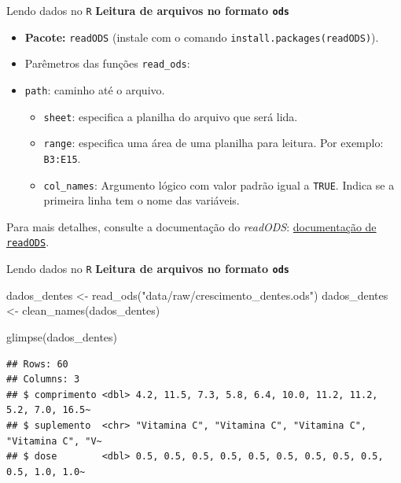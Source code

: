 \documentclass[
  10pt,
  ignorenonframetext,
]{beamer}
\newenvironment{Shaded}{}{}
\newcommand{\KeywordTok}[1]{\textcolor[rgb]{0.00,0.00,1.00}{#1}}
\newcommand{\NormalTok}[1]{#1}
\newcommand{\StringTok}[1]{\textcolor[rgb]{0.00,0.50,0.50}{#1}}
\providecommand{\tightlist}{%
  \setlength{\itemsep}{0pt}\setlength{\parskip}{0pt}}
\begin{document}
\begin{frame}[fragile]{Lendo dados no \texttt{R}}
\protect\hypertarget{lendo-dados-no-r-4}{}
\textbf{Leitura de arquivos no formato \texttt{ods}}

\begin{itemize}
\tightlist
\item
  \textbf{Pacote:} \texttt{readODS} (instale com o comando
  \texttt{install.packages(\textquotesingle{}readODS\textquotesingle{})}).
\item
  Parêmetros das funções \texttt{read\_ods}:
\item
  \texttt{path}: caminho até o arquivo.

  \begin{itemize}
  \tightlist
  \item
    \texttt{sheet}: especifica a planilha do arquivo que será lida.
  \item
    \texttt{range}: especifica uma área de uma planilha para leitura.
    Por exemplo: \texttt{B3:E15}.
  \item
    \texttt{col\_names}: Argumento lógico com valor padrão igual a
    \texttt{TRUE}. Indica se a primeira linha tem o nome das variáveis.
  \end{itemize}
\end{itemize}

Para mais detalhes, consulte a documentação do \emph{readODS}:
\href{https://github.com/chainsawriot/readODS}{documentação de
\texttt{readODS}}.
\end{frame}

\begin{frame}[fragile]{Lendo dados no \texttt{R}}
\protect\hypertarget{lendo-dados-no-r-5}{}
\textbf{Leitura de arquivos no formato \texttt{ods}}

\begin{Shaded}
\begin{Highlighting}[]
\NormalTok{dados\_dentes \textless{}{-}}\StringTok{ }\KeywordTok{read\_ods}\NormalTok{(}\StringTok{"data/raw/crescimento\_dentes.ods"}\NormalTok{)}
\NormalTok{dados\_dentes \textless{}{-}}\StringTok{ }\KeywordTok{clean\_names}\NormalTok{(dados\_dentes)}

\KeywordTok{glimpse}\NormalTok{(dados\_dentes)}
\end{Highlighting}
\end{Shaded}

\begin{verbatim}
## Rows: 60
## Columns: 3
## $ comprimento <dbl> 4.2, 11.5, 7.3, 5.8, 6.4, 10.0, 11.2, 11.2, 5.2, 7.0, 16.5~
## $ suplemento  <chr> "Vitamina C", "Vitamina C", "Vitamina C", "Vitamina C", "V~
## $ dose        <dbl> 0.5, 0.5, 0.5, 0.5, 0.5, 0.5, 0.5, 0.5, 0.5, 0.5, 1.0, 1.0~
\end{verbatim}
\end{frame}
\end{document}
